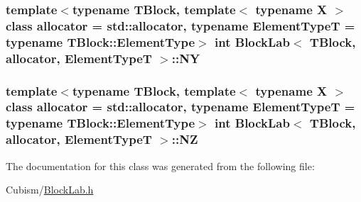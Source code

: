 \subsubsection[{N\+Y}]{\setlength{\rightskip}{0pt plus 5cm}template$<$typename T\+Block, template$<$ typename X $>$ class allocator = std\+::allocator, typename Element\+Type\+T = typename T\+Block\+::\+Element\+Type$>$ int {\bf Block\+Lab}$<$ T\+Block, allocator, Element\+Type\+T $>$\+::N\+Y\hspace{0.3cm}{\ttfamily [protected]}}\label{class_block_lab_aaa1e748664ebb6b4fc7c47cf30a445db}
\hypertarget{class_block_lab_acdd7f4e2489d31da6a2a76099807a7c5}{}
\subsubsection[{N\+Z}]{\setlength{\rightskip}{0pt plus 5cm}template$<$typename T\+Block, template$<$ typename X $>$ class allocator = std\+::allocator, typename Element\+Type\+T = typename T\+Block\+::\+Element\+Type$>$ int {\bf Block\+Lab}$<$ T\+Block, allocator, Element\+Type\+T $>$\+::N\+Z\hspace{0.3cm}{\ttfamily [protected]}}\label{class_block_lab_acdd7f4e2489d31da6a2a76099807a7c5}


The documentation for this class was generated from the following file\+:\begin{DoxyCompactItemize}
\item 
Cubism/\hyperlink{_block_lab_8h}{Block\+Lab.\+h}\end{DoxyCompactItemize}
